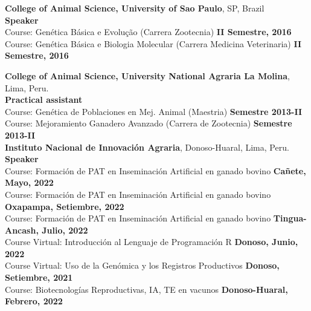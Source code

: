 \documentclass[margin,line,10pt]{res}
\begin{document}
\begin{resume}
{\bf College of Animal Science, University of Sao Paulo}, SP, Brazil\\
\textbf{Speaker} \\
Course: Genética Básica e Evolução (Carrera Zootecnia)   \hfill {\bf II Semestre, 2016}\\
Course: Genética Básica e Biologia Molecular (Carrera Medicina Veterinaria)   \hfill {\bf II Semestre, 2016}\\
\vspace{0.5cm}

{\bf College of Animal Science, University National Agraria La Molina}, Lima, Peru.\\

\vspace{-0.8cm}
\textbf{Practical assistant} \\
Course: Genética de Poblaciones en Mej. Animal (Maestria)     \hfill {\bf Semestre 2013-II} \\
Course: Mejoramiento Ganadero Avanzado (Carrera de Zootecnia)    \hfill {\bf Semestre 2013-II} \\


{\bf Instituto Nacional de Innovación Agraria}, Donoso-Huaral, Lima, Peru.\\

\vspace{-0.8cm}
\textbf{Speaker} \\
Course: Formación de PAT en Inseminación Artificial en ganado bovino     \hfill {\bf Cañete, Mayo, 2022} \\
Course: Formación de PAT en Inseminación Artificial en ganado bovino     \hfill {\bf Oxapampa, Setiembre, 2022} \\
Course: Formación de PAT en Inseminación Artificial en ganado bovino     \hfill {\bf Tingua-Ancash, Julio, 2022} \\
Course Virtual: Introducción al Lenguaje de Programación R     \hfill {\bf Donoso, Junio, 2022} \\
Course Virtual: Uso de la Genómica y los Registros Productivos     \hfill {\bf Donoso, Setiembre, 2021} \\
Course: Biotecnologías Reproductivas, IA, TE en vacunos     \hfill {\bf Donoso-Huaral, Febrero, 2022} \\


\newpage


\end{resume}
\end{document}
